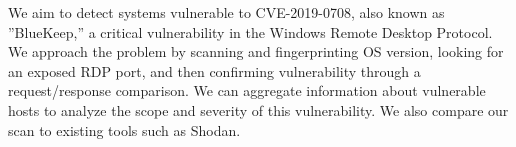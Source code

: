We aim to detect systems vulnerable to CVE-2019-0708, also 
known as ''BlueKeep,'' a critical vulnerability in the Windows 
Remote Desktop Protocol. We approach the problem by
scanning and fingerprinting OS version, looking for an 
exposed RDP port, and then confirming vulnerability through
a request/response comparison. We can aggregate information
about vulnerable hosts to analyze the scope and severity of 
this vulnerability. We also compare our scan to existing tools
such as Shodan.

